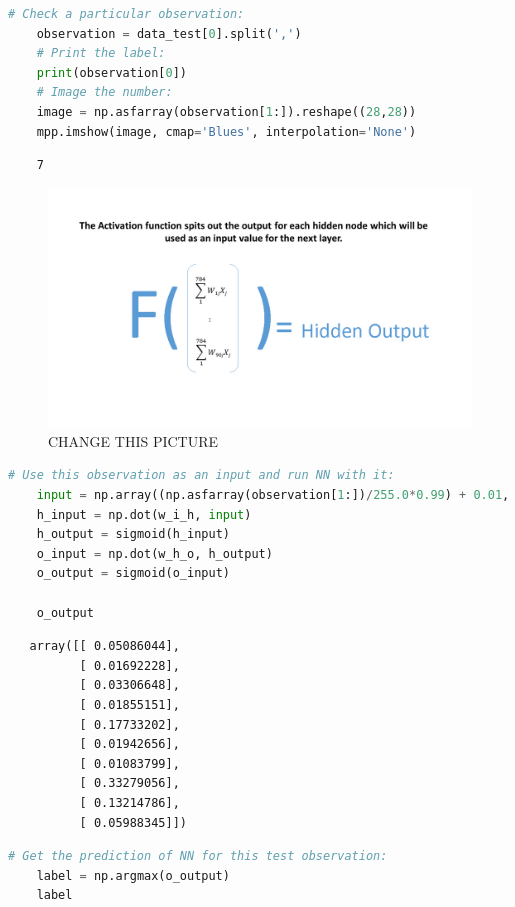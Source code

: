 \begin{lstlisting}[language=Python]
    # Check a particular observation:
    observation = data_test[0].split(',')
    # Print the label:
    print(observation[0])
    # Image the number:
    image = np.asfarray(observation[1:]).reshape((28,28))
    mpp.imshow(image, cmap='Blues', interpolation='None')
\end{lstlisting}

\begin{lstlisting}
    7
\end{lstlisting}

\begin{figure}[H]
    \includegraphics[width=\linewidth]{pics/activation.jpg}
    \caption{\label{fig:bp} CHANGE THIS PICTURE}
\end{figure}

\begin{lstlisting}[language=Python]
    # Use this observation as an input and run NN with it:
    input = np.array((np.asfarray(observation[1:])/255.0*0.99) + 0.01, ndmin=2).T
    h_input = np.dot(w_i_h, input)
    h_output = sigmoid(h_input)
    o_input = np.dot(w_h_o, h_output)
    o_output = sigmoid(o_input)
    
    o_output
\end{lstlisting}

\begin{lstlisting}
   array([[ 0.05086044],
          [ 0.01692228],
          [ 0.03306648],
          [ 0.01855151],
          [ 0.17733202],
          [ 0.01942656],
          [ 0.01083799],
          [ 0.33279056],
          [ 0.13214786],
          [ 0.05988345]])
\end{lstlisting}

\begin{lstlisting}[language=Python]
    # Get the prediction of NN for this test observation:
    label = np.argmax(o_output)
    label
\end{lstlisting}

